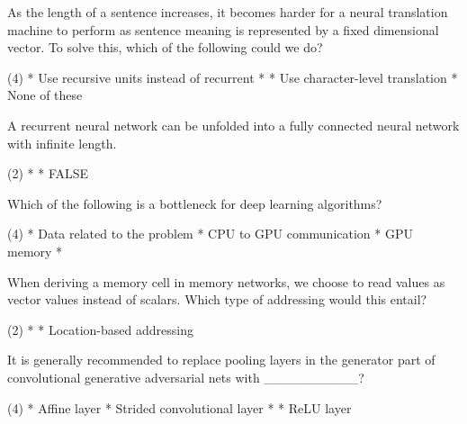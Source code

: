 \documentclass[10pt]{extarticle}
\begin{document}
\begin{exercise}
    As the length of a sentence increases, it becomes harder for a neural translation machine to perform as sentence meaning is represented by a fixed dimensional vector. To solve this, which of the following could we do?
    \begin{choice} (4)
        * Use recursive units instead of recurrent
        *
        * Use character-level translation
        * None of these
    \end{choice}
\end{exercise}
\begin{solution}
\end{solution}

\begin{exercise}
    A recurrent neural network can be unfolded into a fully connected neural network with infinite length.
    \begin{choice} (2)
        *
        * FALSE
    \end{choice}
\end{exercise}
\begin{solution}
\end{solution}

\begin{exercise}
    Which of the following is a bottleneck for deep learning algorithms?
    \begin{choice} (4)
        * Data related to the problem
        * CPU to GPU communication
        * GPU memory
        *
    \end{choice}
\end{exercise}
\begin{solution}
\end{solution}

\begin{exercise}
    When deriving a memory cell in memory networks, we choose to read values as vector values instead of scalars. Which type of addressing would this entail?
    \begin{choice} (2)
        *
        * Location-based addressing
    \end{choice}
\end{exercise}
\begin{solution}
\end{solution}

\begin{exercise}
    It is generally recommended to replace pooling layers in the generator part of convolutional generative adversarial nets with \_\_\_\_\_\_\_\_\_\_?
    \begin{choice} (4)
        * Affine layer
        * Strided convolutional layer
        *
        * ReLU layer
    \end{choice}
\end{exercise}
\begin{solution}
\end{solution}
\end{document}
